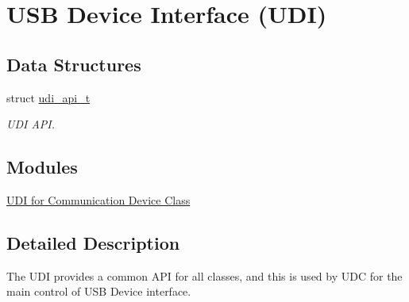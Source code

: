 \hypertarget{group__udi__group}{
\section{\-U\-S\-B \-Device \-Interface (\-U\-D\-I)}
\label{group__udi__group}
}
\subsection*{\-Data \-Structures}
\begin{DoxyCompactItemize}
\item 
struct \hyperlink{structudi__api__t}{udi\-\_\-api\-\_\-t}
\begin{DoxyCompactList}\small\item\em \-U\-D\-I \-A\-P\-I. \end{DoxyCompactList}\end{DoxyCompactItemize}
\subsection*{\-Modules}
\begin{DoxyCompactItemize}
\item 
\hyperlink{group__udi__cdc__group}{\-U\-D\-I for Communication Device Class}
\end{DoxyCompactItemize}


\subsection{\-Detailed \-Description}
\-The \-U\-D\-I provides a common \-A\-P\-I for all classes, and this is used by \-U\-D\-C for the main control of \-U\-S\-B \-Device interface. 
